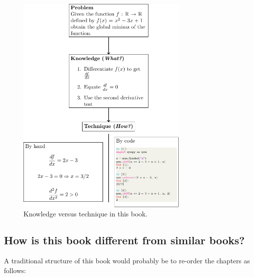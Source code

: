 \begin{figure}[htbp!]
\centering

\includegraphics[width=0.75\textwidth]{assets/knowledge_vs_technique/main.pdf}
\caption{Knowledge versus technique in this
    book.}\label{fig:knowledge_vs_technique}
\end{figure}

\subsection{How is this book different from similar books?}

A traditional structure of this book would probably be to re-order the chapters
as follows:

